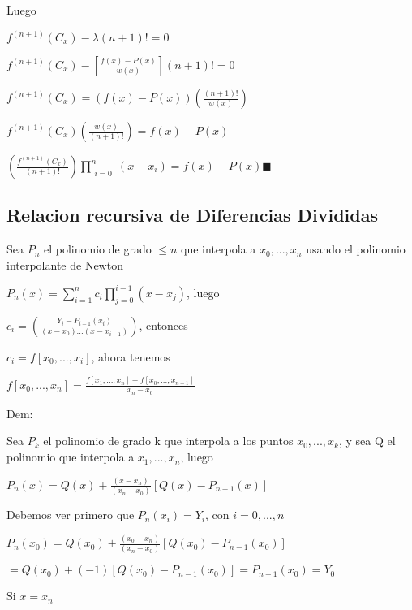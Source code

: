\documentclass{article}
\begin{document}
Luego

$f^{(n+1)}(C_x)-\lambda (n+1)! = 0$

$f^{(n+1)}(C_x)- \left[ \displaystyle\frac{f(x)-P(x)}{w(x)} \right] (n+1)! = 0$

$f^{(n+1)}(C_x) = (f(x)-P(x))\left( \displaystyle\frac{(n+1)!}{w(x)} \right)   $

$f^{(n+1)}(C_x)\left( \displaystyle\frac{w(x)}{(n+1)!} \right) = f(x)-P(x)   $

$\left( \displaystyle\frac{f^{(n+1)}(C_x)}{(n+1)!} \right)\prod\limits_{\substack{i=0}}^{n} (x-x_i)  = f(x)-P(x)   $$\blacksquare$

\vspace{10mm}

\subsection{Relacion recursiva de Diferencias Divididas}\label{Relacion-recursiva-de-Diferencias-Divididas}

Sea $P_n$ el polinomio de grado $\leq n$ que interpola a $x_0,...,x_n$ usando el polinomio interpolante de Newton

$P_n(x) = \sum\limits_{i=1}^{n} c_i \prod\limits_{j=0}^{i-1}(x-x_j)$, luego

$c_i = \left( \displaystyle\frac{Y_i - P_{i-1}(x_i)}{(x-x_0)...(x-x_{i-1})} \right)$, entonces

$c_i = f[x_0,...,x_i] $, ahora tenemos

$f[x_0,...,x_n] = \displaystyle\frac{f[x_1,...,x_n]-f[x_0,...,x_{n-1}]}{x_n-x_0} $

Dem:

Sea  $P_k$ el polinomio de grado k que interpola a los puntos $x_0,...,x_k$, y sea Q el polinomio que interpola
a $x_1,...,x_n$, luego

$P_n(x) = Q(x) + \displaystyle\frac{(x-x_n)}{(x_n-x_0)}[Q(x)-P_{n-1}(x)]$

Debemos ver primero que $P_n(x_i) = Y_i$, con $i =0,...,n$


$P_n(x_0)=Q(x_0)+\displaystyle\frac{(x_0-x_n)}{(x_n-x_0)}[Q(x_0)-P_{n-1}(x_0)]$

\vspace{5mm}

$=Q(x_0)+(-1)[Q(x_0)-P_{n-1}(x_0)]=P_{n-1}(x_0)=Y_0$

\vspace{5mm}

Si $x=x_n$

\vspace{5mm}
\end{document}
